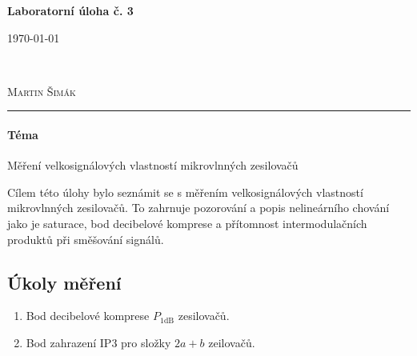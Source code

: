 \documentclass[11pt,a4paper]{article}
\begin{document}

\begin{center}
    {\LARGE\textbf{Laboratorní úloha č. 3}}\\[3mm]
    \begin{minipage}{0.4\textwidth}
        \begin{flushleft}
            \textsc{\today}
        \end{flushleft}
    \end{minipage}
    ~
    \begin{minipage}{0.4\textwidth}
        \begin{flushright}
            \textsc{Martin Šimák}
        \end{flushright}
    \end{minipage}
    \noindent\rule{14.5cm}{0.4pt}
\end{center}

\paragraph*{Téma} Měření velkosignálových vlastností mikrovlnných zesilovačů

Cílem této úlohy bylo seznámit se s měřením velkosignálových vlastností mikrovlnných zesilovačů. To zahrnuje pozorování a popis nelineárního chování jako je saturace, bod decibelové komprese a přítomnost intermodulačních produktů při směšování signálů.


\subsection*{Úkoly měření}
\begin{enumerate}%
    \item Bod decibelové komprese $P_{1\mathrm{dB}}$ zesilovačů.
    \item Bod zahrazení IP3 pro složky $2a+b$ zeilovačů.
\end{enumerate}
\end{document}
